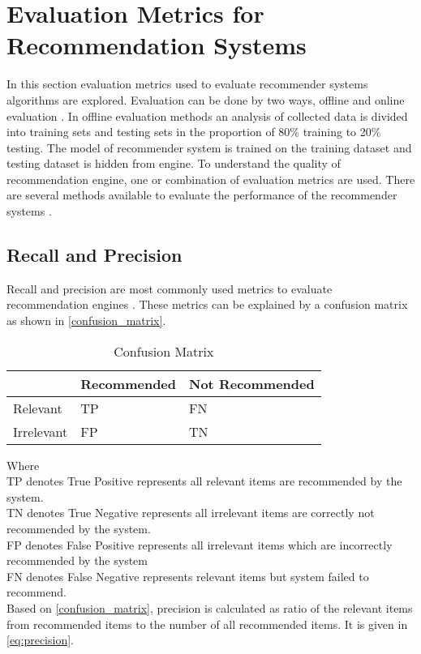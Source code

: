 
\section{Evaluation Metrics for Recommendation Systems}
\label{sec:eval_metrics}

In this section evaluation metrics used to evaluate recommender systems algorithms are explored. Evaluation can be done by two ways, offline and online evaluation \cite{22,23}. In offline evaluation methods an analysis of collected data is divided into training sets and testing sets in the proportion of 80\% training to 20\% testing. The model of recommender system is trained on the training dataset and testing dataset is hidden from engine. To understand the quality of recommendation engine, one or combination of evaluation metrics are used. There are several methods available to evaluate the performance of the recommender systems \cite{22,24}. 
  
\subsection{Recall and Precision}

Recall and precision are most commonly used metrics to evaluate recommendation engines \cite{25}. These metrics can be explained by a confusion matrix \cite{21} as shown in \autoref{confusion_matrix}.

\begin{table}[]
\begin{tabular}{lll}
\hline
                                 & Recommended             & Not Recommended         \\ \hline
\multicolumn{1}{|l|}{Relevant}   & \multicolumn{1}{l|}{TP} & \multicolumn{1}{l|}{FN} \\ \hline
\multicolumn{1}{|l|}{Irrelevant} & \multicolumn{1}{l|}{FP} & \multicolumn{1}{l|}{TN} \\ \hline
\end{tabular}
\caption{Confusion Matrix \cite{21}}
\label{confusion_matrix}
\end{table}

\noindent Where\\
TP denotes True Positive represents all relevant items are recommended by the system.\\
TN denotes True Negative represents all irrelevant items are correctly not recommended by the system.  \\
FP denotes False Positive represents all irrelevant items which are
incorrectly recommended by the system\\
FN denotes False Negative represents relevant items but system failed to recommend.\\
\noindent Based on \autoref{confusion_matrix}, precision is calculated as ratio of the relevant items from recommended items to the number of all recommended items. It is given in \autoref{eq:precision}. 

